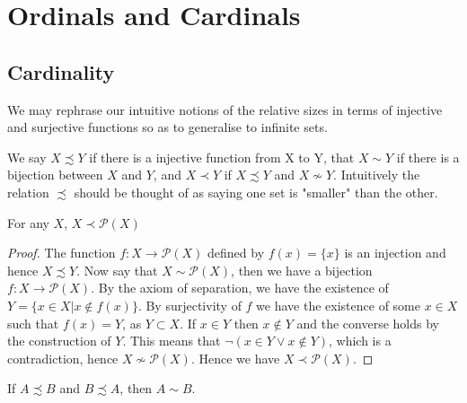 \documentclass[]{article}
\begin{document}
\section{Ordinals and Cardinals}

\subsection{Cardinality}

We may rephrase our intuitive notions of the relative sizes in terms of injective and surjective functions so as to generalise to infinite sets.

We say $X \precsim Y$ if there is a injective function from X to Y, that $X \sim Y$ if there is a bijection between $X$ and $Y$, and $X \prec Y$ if $X \precsim Y$ and $X \not\sim Y$. Intuitively the relation $\precsim$ should be thought of as saying one set is "smaller" than the other.

\begin{thm}  \label{thm:cantor}
		For any $X$, $X \prec \mathcal{P}(X)$	
\end{thm}

\begin{proof}
The function $f: X \to \mathcal{P}(X)$ defined by $f(x) = \{x\}$ is an injection and hence $X \precsim Y$. Now say that $X \sim \mathcal{P}(X)$, then we have a bijection $f: X \to \mathcal{P}(X)$. By the axiom of separation, we have the existence of $Y = \{x \in X | x \not \in f(x)\}$. By surjectivity of  $f$ we have the existence of some $x \in X$ such that $f(x) = Y$, as  $Y \subset X$. If $x \in Y$ then $x \not\in Y$ and the converse holds by the construction of $Y$. This means that $\lnot (x \in Y \lor x \not\in Y)$, which is a contradiction, hence  $X \not\sim \mathcal{P}(X)$. Hence we have $X \prec \mathcal{P}(X)$.
\end{proof}

\begin{thm}  \label{thm:cantor-bernstein}
	If $A \precsim B$ and $B \precsim A$, then $A \sim B$.
\end{thm}
\end{document}
